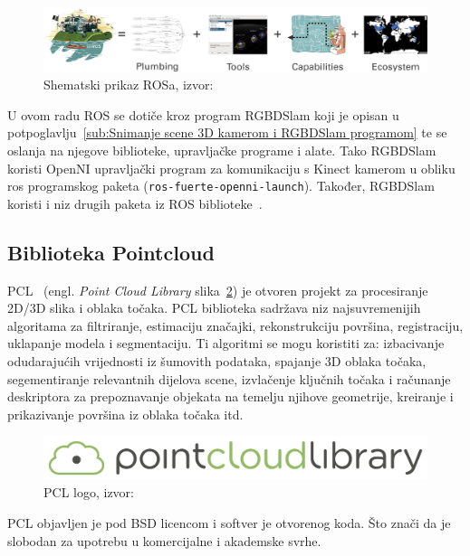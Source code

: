 \begin{figure}[h]
\centering
\includegraphics[scale=0.45]{figures/ros.png}
\caption[]{Shematski prikaz ROSa, izvor:~\cite{web:ros}}
\label{fig:ros.png}
\end{figure}

U ovom radu ROS se dotiče kroz program RGBDSlam koji je opisan u
potpoglavlju~\ref{sub:Snimanje scene 3D kamerom i RGBDSlam programom} te
se oslanja na njegove biblioteke, upravljačke programe i alate. Tako
RGBDSlam koristi OpenNI upravljački program za komunikaciju s Kinect
kamerom u obliku ros programskog paketa
(\texttt{ros-fuerte-openni-launch}). Također, RGBDSlam koristi i niz
drugih paketa iz ROS biblioteke~\cite{web:rgbdslam}.


\newpage
\subsection{Biblioteka Pointcloud} %
\label{sub:Biblioteka Pointcloud}

PCL~\cite{pcl} (engl. \textit{Point Cloud Library}
slika~\ref{fig:pcl.png}) je otvoren projekt za procesiranje 2D/3D slika
i oblaka točaka. PCL biblioteka sadržava niz najsuvremenijih algoritama
za filtriranje, estimaciju značajki, rekonstrukciju površina,
registraciju, uklapanje modela i segmentaciju.  Ti algoritmi se mogu
koristiti za: izbacivanje odudarajućih vrijednosti iz šumovith
podataka, spajanje 3D oblaka točaka, segementiranje relevantnih dijelova
scene, izvlačenje ključnih točaka i računanje deskriptora za
prepoznavanje objekata na temelju njihove geometrije, kreiranje i
prikazivanje površina iz oblaka točaka itd.

\begin{figure}[h]
\centering
\includegraphics[scale=0.15]{figures/pcl.png}
\caption{PCL logo, izvor:~\cite{web:pcl}}
\label{fig:pcl.png}
\end{figure}

PCL objavljen je pod BSD licencom i softver je otvorenog koda. Što znači
da je slobodan za upotrebu u komercijalne i akademske svrhe.

